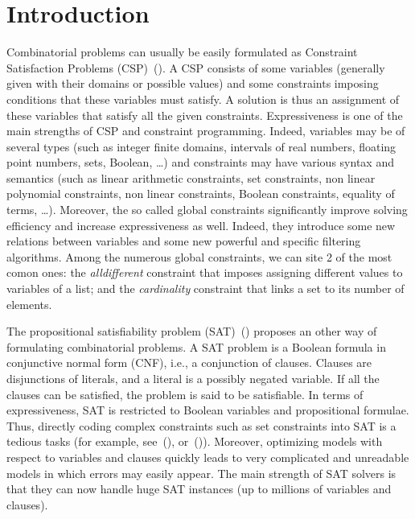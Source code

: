 \documentclass[3p,authoryear,times]{elsarticle}
\begin{document}
\section{Introduction}







Combinatorial problems can usually be easily formulated as Constraint Satisfaction Problems (CSP)~(\cite{handbookCP}).
A CSP consists of some variables (generally given with their domains or possible values) and some constraints imposing conditions that these variables must satisfy. 
A solution is thus an  assignment of these variables that satisfy all the given constraints. 
Expressiveness is one of the main strengths of CSP and constraint programming. Indeed, variables may be of several types (such as integer finite domains, intervals of real numbers, floating point numbers, sets, Boolean, \ldots) and constraints may have various syntax and semantics (such as linear arithmetic constraints, set constraints, non linear polynomial constraints, non linear constraints, Boolean constraints, equality of terms, \ldots). Moreover, the so called global constraints significantly improve solving efficiency and increase expressiveness as well. Indeed, they introduce some new relations between variables and some new powerful and specific filtering algorithms. Among the numerous global constraints, we can site 2 of the most comon ones: the \textit{alldifferent} constraint that imposes assigning different values to variables of a list; and the  \textit{cardinality} constraint that links a set to its number of elements.

\color{red}

\medskip
The propositional satisfiability problem (SAT)~(\cite{garey79}) proposes an other way of formulating combinatorial problems. A SAT problem 
is a Boolean formula in conjunctive normal form (CNF), i.e., a conjunction of clauses. Clauses are disjunctions of literals, and a literal is a possibly negated variable. If all the clauses can be satisfied, the problem is said to be satisfiable. In terms of expressiveness,
SAT is restricted to Boolean variables and propositional formulae. Thus, directly coding  complex constraints such as set constraints  into SAT is a tedious tasks (for example, see~(\cite{TriskaMusliu2012}), or~(\cite{GentLynce2005})). Moreover, optimizing models with respect to variables and clauses quickly leads to very complicated and unreadable models in which errors may easily appear. The main strength of SAT solvers is that they can now handle huge SAT instances (up to millions of variables and clauses). 
\end{document}
